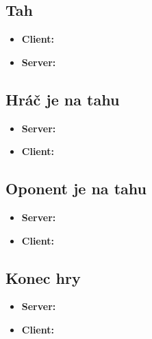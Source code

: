 \documentclass[12pt,a4paper]{article}
\begin{document}
\subsection{Tah}
\begin{itemize}
	\item \textbf{Client:} 
	\item \textbf{Server:} 
\end{itemize}

\subsection{Hráč je na tahu}
\begin{itemize}
	\item \textbf{Server:} 
	\item \textbf{Client:} 
\end{itemize}

\subsection{Oponent je na tahu}
\begin{itemize}
	\item \textbf{Server:} 
	\item \textbf{Client:} 

\end{itemize}

\subsection{Konec hry}
\begin{itemize}
	\item \textbf{Server:} 
	\item \textbf{Client:} 
\end{itemize}
\end{document}
